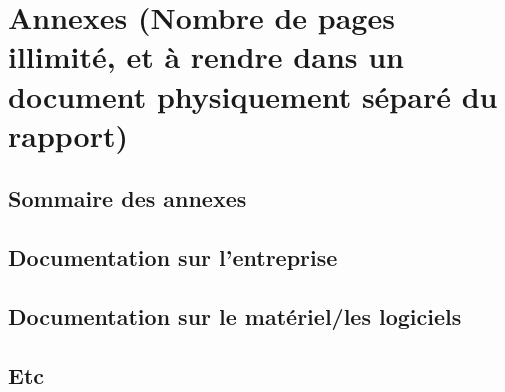 \documentclass[a4paper, 12pt]{article}
\begin{document}



\newpage{}

\thispagestyle{empty}
\printglossary[title={Glossaire}, toctitle={Glossaire}]
\newpage{}

\thispagestyle{empty}
\listoffigures
\newpage{}

\thispagestyle{empty}
% 
% 
% 
\printbibliography
\newpage{}

\section{Annexes (Nombre de pages illimité, et à rendre dans un document physiquement séparé du rapport)}


\subsection{Sommaire des annexes}

\subsection{Documentation sur l’entreprise}

\subsection{Documentation sur le matériel/les logiciels}

\subsection{Etc}
\end{document}
